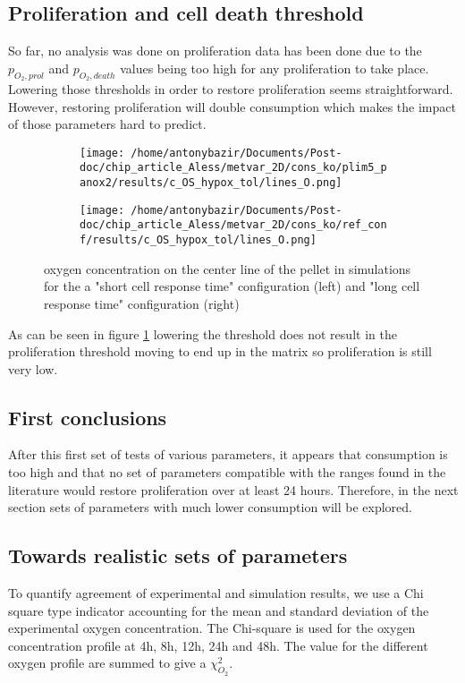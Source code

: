 \documentclass[11pt,a4paper]{article}
\begin{document}
\subsection{Proliferation and cell death threshold}
So far, no analysis was done on proliferation data has been done due to the $p_{O_2,prol}$ and $p_{O_2,death}$ values being too high for any proliferation to take place. Lowering those thresholds in order to restore proliferation seems straightforward. However, restoring proliferation will double consumption which makes the impact of those parameters hard to predict.   

\begin{figure}[ht!]
\begin{subfigure}{0.44\textwidth}
	\centering
	\texttt{[image: /home/antonybazir/Documents/Post-doc/chip\_article\_Aless/metvar\_2D/cons\_ko/plim5\_panox2/results/c\_OS\_hypox\_tol/lines\_O.png]}
\end{subfigure}
\begin{subfigure}{0.44\textwidth}
	\centering
	\texttt{[image: /home/antonybazir/Documents/Post-doc/chip\_article\_Aless/metvar\_2D/cons\_ko/ref\_conf/results/c\_OS\_hypox\_tol/lines\_O.png]}
\end{subfigure}
\caption{oxygen concentration on the center line of the pellet in simulations for the a "short cell response time" configuration (left) and "long cell response time" configuration (right)  \label{thres_map}}
\end{figure}

As can be seen in figure \ref{thres_map} lowering the threshold does not result in the proliferation threshold moving to end up in the matrix so proliferation is still very low.

\subsection{First conclusions}
After this first set of tests of various parameters, it appears that consumption is too high and that no set of parameters compatible with the  ranges found in the literature would restore proliferation over at least 24 hours. Therefore, in the next section sets of parameters with much lower consumption will be explored.
 
\subsection{Towards realistic sets of parameters}
To quantify agreement of experimental and  simulation results, we use a Chi square type indicator accounting for the mean and standard deviation of the experimental oxygen concentration.\cite{Press1992} The Chi-square is used for the oxygen concentration profile at 4h, 8h, 12h, 24h  and 48h. The value for the different oxygen profile are summed to give a $\chi_{O_2}^2$.
\end{document}
